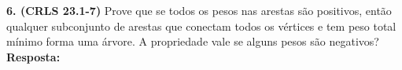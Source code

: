 
\noindent\textbf{6. (CRLS 23.1-7)} Prove que se todos os pesos nas arestas são positivos, então qualquer subconjunto de arestas que conectam todos os vértices e tem peso total mínimo forma uma árvore. A propriedade vale se alguns pesos são negativos?\\[6pt]
\textbf{Resposta:}
